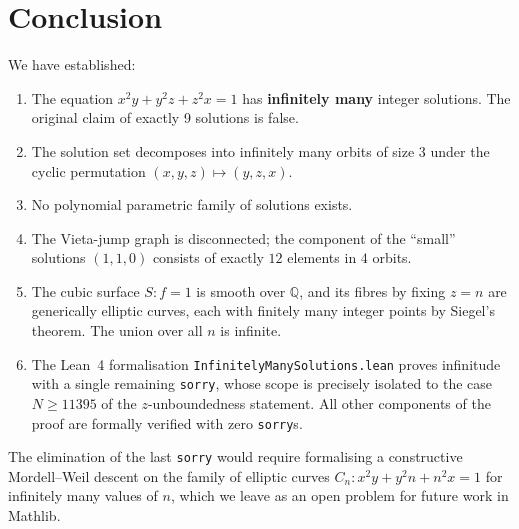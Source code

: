 \documentclass[12pt,a4paper]{article}
\theoremstyle{definition}
\newcommand{\Q}{\mathbb{Q}}
\begin{document}
\section{Conclusion}\label{sec:conclusion}

We have established:

\begin{enumerate}[label=(\roman*)]
  \item The equation $x^2y + y^2z + z^2x = 1$ has \textbf{infinitely many}
    integer solutions.  The original claim of exactly 9 solutions is false.
  \item The solution set decomposes into infinitely many orbits of size $3$
    under the cyclic permutation $(x,y,z)\mapsto(y,z,x)$.
  \item No polynomial parametric family of solutions exists.
  \item The Vieta-jump graph is disconnected; the component of the ``small''
    solutions $(1,1,0)$ consists of exactly $12$ elements in $4$ orbits.
  \item The cubic surface $S: f=1$ is smooth over $\Q$, and its fibres by
    fixing $z=n$ are generically elliptic curves, each with finitely many
    integer points by Siegel's theorem.  The union over all $n$ is infinite.
  \item The Lean~4 formalisation \texttt{InfinitelyManySolutions.lean}
    proves infinitude with a single remaining \texttt{sorry}, whose
    scope is precisely isolated to the case $N \ge 11395$ of the
    $z$-unboundedness statement.  All other components of the proof
    are formally verified with zero \texttt{sorry}s.
\end{enumerate}

The elimination of the last \texttt{sorry} would require formalising a
constructive Mordell--Weil descent on the family of elliptic curves
$C_n: x^2y + y^2n + n^2 x = 1$ for infinitely many values of $n$,
which we leave as an open problem for future work in Mathlib.
\end{document}
